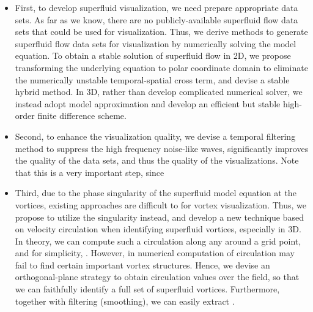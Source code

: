 \documentclass[10pt,journal,compsoc,twoside]{IEEEtran}
\newcommand{\rd}[1]{{\color[rgb]{0.0,0.0,0.0}{#1}}}
\begin{document}
	\begin{itemize}
		
		\vspace*{-0.25mm}
		\item
		First, to develop superfluid visualization, we need prepare appropriate data sets.
		As far as we know, there are no publicly-available superfluid flow data sets that could be used for visualization.
		Thus, we derive methods to generate superfluid flow data sets for visualization by numerically solving the model equation.
		To obtain a stable solution of superfluid flow in 2D, we propose transforming the underlying equation to polar coordinate domain to eliminate the numerically unstable temporal-spatial cross term, and devise a stable hybrid method.
		In 3D, rather than develop complicated numerical solver, we instead adopt model approximation and develop an efficient but stable high-order finite difference scheme.
		
		\vspace*{1mm}
		\item
		Second, to enhance the visualization quality, we devise a temporal filtering method to suppress the high frequency noise-like waves, \rd{which} significantly improves the quality of the data sets, and thus the quality of the visualizations.
		Note that this is a very important step, since \rd{without such a filtering, noise-like waves may seriously influence the vortex identification, which could lead to erroneous visualizations.}
		
		\item
		Third, due to the phase singularity of the superfluid model equation at the vortices, existing approaches are difficult to \rd{apply} for vortex visualization.
		Thus, we propose to utilize the singularity instead, and develop a new technique based on velocity circulation when identifying superfluid vortices, especially in 3D.
		In theory, we can compute such a circulation along any \rd{closed curve} around a grid point, and for simplicity, \rd{a closed curve on a plane in 3D}.
		However, \rd{ambiguities} in numerical computation of circulation may fail to find certain important vortex structures.
		Hence, we devise an orthogonal-plane strategy to obtain \rd{complete} circulation values over the field, so that we can faithfully identify a full set of superfluid vortices.
		Furthermore, together with filtering (smoothing), we can easily extract \rd{vortex tubes suitable for visualization}.
		

\end{itemize}
\end{document}
